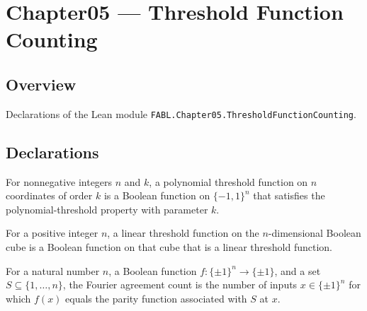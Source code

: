 \chapter{Chapter05 — Threshold Function Counting}
\section{Overview}

Declarations of the Lean module \texttt{FABL.Chapter05.ThresholdFunctionCounting}.

\section{Declarations}

\begin{definition}
\label{FABL.PolynomialThresholdFunction}
\leanok
{}
For nonnegative integers $n$ and $k$, a polynomial threshold function on $n$ coordinates
of order $k$ is a Boolean function on $\{-1,1\}^n$ that satisfies the
polynomial-threshold property with parameter $k$.
\end{definition}

\begin{definition}
\label{FABL.LinearThresholdFunction}
\leanok
{}
For a positive integer $n$, a linear threshold function on the $n$-dimensional Boolean
cube is a Boolean function on that cube that is a linear threshold function.
\end{definition}

\begin{definition}
\label{FABL.fourierAgreementCount}
\leanok
{}
For a natural number $n$, a Boolean function $f:\{\pm1\}^n\to\{\pm1\}$, and a set
$S\subseteq\{1,\ldots,n\}$, the Fourier agreement count is the number of inputs
$x\in\{\pm1\}^n$ for which $f(x)$ equals the parity function associated with $S$ at $x$.
\end{definition}

